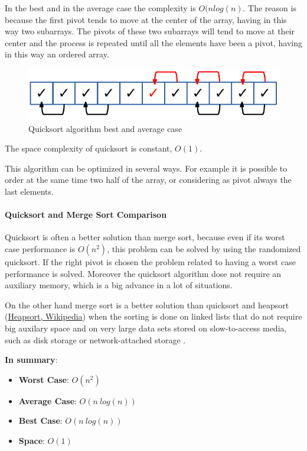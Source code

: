 In the best and in the average case the complexity is \(O(n log(n)\). The reason is because the first pivot tends to move at the center of the array, having in this way two subarrays. The pivots of these two subarrays will tend to move at their center and the process is repeated until all the elements have been a pivot, having in this way an ordered array.

\begin{figure}[H]
	\begin{center}
		\includegraphics[scale=.6]{chapters/searchandsorting/images/sorting_11.pdf}
		\caption[Quicksort algorithm best and average case]{Quicksort algorithm best and average case}
		\label{sorting_11}
	\end{center}
\end{figure}

The space complexity of quicksort is constant, \(O(1)\).

This algorithm can be optimized in several ways. For example it is possible to order at the same time two half of the array, or considering as pivot always the last elements.

\paragraph{Quicksort and Merge Sort Comparison}
Quicksort is often a better solution than merge sort, because even if its worst case performance is \(O(n^{2})\), this problem can be solved by using the randomized quicksort. If the right pivot is chosen the problem related to having a worst case performance is solved. Moreover the quicksort algorithm dose not require an auxiliary memory, which is a big advance in a lot of situations.

On the other hand merge sort is a better solution than quicksort and heapsort \cite{wikiheapsort} (\href{https://en.wikipedia.org/wiki/Heapsort}{Heapsort, Wikipedia}) when the sorting is done on linked lists that do not require big auxilary space and on very large data sets stored on slow-to-access media, such as disk storage or network-attached storage \cite{wikiqicksort}.

\textbf{In summary}:
\begin{itemize}
\item \textbf{Worst Case}: \(O(n^{2})\)
\item \textbf{Average Case}: \(O(n\ log(n))\)
\item \textbf{Best Case}: \(O(n\ log(n))\)
\item \textbf{Space}: \(O(1)\)
\end{itemize}

